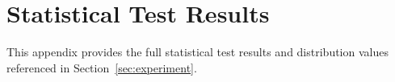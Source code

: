 \section{Statistical Test Results}
\label{app:statistical_tables}

This appendix provides the full statistical test results and distribution values referenced in Section~\ref{sec:experiment}.









